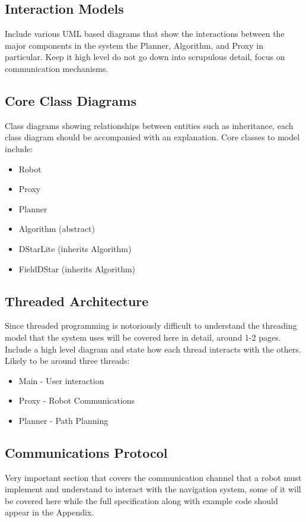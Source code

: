 \subsection{Interaction Models}
Include various UML based diagrams that show the interactions between the major components in the system the Planner, Algorithm, and Proxy in particular. Keep it high level do not go down into scrupulous detail, focus on communication mechanisms. 

\subsection{Core Class Diagrams}

\noindent
Class diagrams showing relationships between entities such as inheritance, each class diagram should be accompanied with an explanation. Core classes to model include:

\begin{itemize}
\item Robot
\item Proxy
\item Planner
\item Algorithm (abstract)
\item DStarLite (inherits Algorithm)
\item FieldDStar (inherits Algorithm)
\end{itemize} 

\newpage

\subsection{Threaded Architecture}

\noindent
Since threaded programming is notoriously difficult to understand the threading model that the system uses will be covered here in detail, around 1-2 pages. Include a high level diagram and state how each thread interacts with the others. Likely to be around three threads:

\begin{itemize}
\item Main - User interaction
\item Proxy - Robot Communications
\item Planner - Path Planning
\end{itemize} 

\subsection{Communications Protocol}
Very important section that covers the communication channel that a robot must implement and understand to interact with the navigation system, some of it will be covered here while the full specification along with example code should appear in the Appendix.

